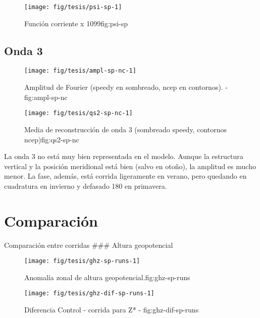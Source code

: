 \documentclass[spanish,a4paper]{book}
\begin{document}
\begin{figure}

{\centering \texttt{[image: fig/tesis/psi-sp-1]} 

}

\caption{Función corriente x 1099{fig:psi-sp}}\label{fig:psi-sp}
\end{figure}

\subsection{Onda 3}\label{onda-3-1}

\begin{figure*}
\texttt{[image: fig/tesis/ampl-sp-nc-1]} \caption{Amplitud de Fourier (speedy en sombreado, ncep en contornos). - fig:ampl-sp-nc}\label{fig:ampl-sp-nc}
\end{figure*}

\begin{figure*}
\texttt{[image: fig/tesis/qs2-sp-nc-1]} \caption{Media de reconstrucción de onda 3 (sombreado speedy, contornos ncep){fig:qs2-sp-nc}}\label{fig:qs2-sp-nc}
\end{figure*}

La onda 3 no está muy bien representada en el modelo. Aunque la
estructura vertical y la posición meridional está bien (salvo en otoño),
la amplitud es mucho menor. La fase, además, está corrida ligeramente en
verano, pero quedando en cuadratura en invierno y defasado 180 en
primavera.

\section{Comparación}\label{comparacion}

Comparación entre corridas \#\#\# Altura geopotencial

\begin{figure}

{\centering \texttt{[image: fig/tesis/ghz-sp-runs-1]} 

}

\caption{Anomalía zonal de altura geopotencial.{fig:ghz-sp-runs}}\label{fig:ghz-sp-runs}
\end{figure}

\begin{figure}
\texttt{[image: fig/tesis/ghz-dif-sp-runs-1]} \caption{Diferencia Control - corrida para Z* - fig:ghz-dif-sp-runs}\label{fig:ghz-dif-sp-runs}
\end{figure}
\end{document}
